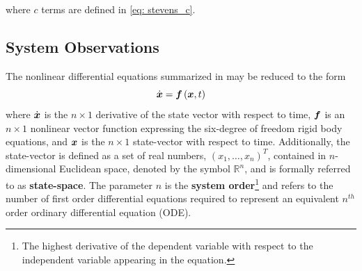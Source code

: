 \documentclass[12pt]{ucthesis}
\begin{document}
where $c$ terms are defined in \autoref{eq: stevens_c}.

\subsection{System Observations}
\label{subsec: system_observations}
The nonlinear differential equations summarized in  may be reduced to the form%
%
\begin{equation}
	\dot{\boldsymbol{x}} = \boldsymbol{f} \left( \boldsymbol{x},t \right)
	\label{eq: x_dot}
\end{equation} %
%
where $\dot{\boldsymbol{x}}$ is the $n\times 1$ derivative of the state vector with respect to time, $\boldsymbol{f}$ is an $n\times 1$ nonlinear vector function expressing the six-degree of freedom rigid body equations, and $\boldsymbol{x}$ is the $n\times 1$ state-vector with respect to time. Additionally, the state-vector is defined as a set of real numbers, ${(x_1,\ldots,x_n)}^T$, contained in $n$-dimensional Euclidean space, denoted by the symbol  $\mathbb{R}^n$, and is formally referred to as \textbf{state-space}. The parameter $n$ is the \textbf{system order}\footnote{The highest derivative of the dependent variable with respect to the independent variable appearing in the equation.} and refers to the number of first order differential equations required to represent an equivalent $n^{th}$ order ordinary differential equation (ODE).
\end{document}
